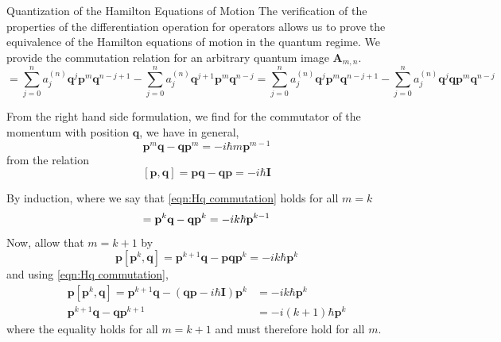 \documentclass[aspectratio=169]{beamer}
\begin{document}
	\begin{frame}[allowframebreaks]{Quantization of the Hamilton Equations of Motion}
		The verification of the properties of the differentiation operation for operators allows us to prove the equivalence of the Hamilton equations of motion in the quantum regime. We provide the commutation relation for an arbitrary quantum image $\textbf{A}_{m,n}$.
		\begin{equation}
			[\textbf{A}_{m,n},\textbf{q}]=\sum_{j=0}^na_j^{(n)}\textbf{q}^{j}\textbf{p}^m\textbf{q}^{n-j+1}-\sum_{j=0}^na_j^{(n)}\textbf{q}^{j+1}\textbf{p}^m\textbf{q}^{n-j}=\sum_{j=0}^na_j^{(n)}\textbf{q}^{j}\textbf{p}^m\textbf{q}^{n-j+1}-\sum_{j=0}^na_j^{(n)}\textbf{q}^{j}\textbf{q}\textbf{p}^m\textbf{q}^{n-j}
		\end{equation}
		
		From the right hand side formulation, we find for the commutator of the momentum with position $\textbf{q}$, we have in general, 
		\begin{equation}
			\textbf{p}^m\textbf{q}-\textbf{q}\textbf{p}^m=-i\hbar m\textbf{p}^{m-1}
		\end{equation}
		from the relation
		\begin{equation}\label{eqn:Hq commutation}
			[\textbf{p},\textbf{q}]=\textbf{p}\textbf{q}-\textbf{q}\textbf{p}=-i\hbar\textbf{I}
		\end{equation}
		
		By induction, where we say that \ref{eqn:Hq commutation} holds for all $m=k$
		\begin{equation}
			[\textbf{p}^k,\textbf{q}]=\textbf{p}^k\textbf{q}-\textbf{q}\textbf{p}^k=-ik\hbar\textbf{\textbf{p}}^{k-1}
		\end{equation}
		Now, allow that $m=k+1$ by
		\begin{equation}
			\textbf{p}[\textbf{p}^k,\textbf{q}]=\textbf{p}^{k+1}\textbf{q}-\textbf{p}\textbf{q}\textbf{p}^{k}=-ik\hbar\textbf{p}^{k}
		\end{equation}
		and using \ref{eqn:Hq commutation},
		\begin{align}
			\textbf{p}[\textbf{p}^k,\textbf{q}]=\textbf{p}^{k+1}\textbf{q}-(\textbf{q}\textbf{p}-i\hbar\textbf{I})\textbf{p}^{k}&=-ik\hbar\textbf{p}^{k} \\
			\textbf{p}^{k+1}\textbf{q}-\textbf{q}\textbf{p}^{k+1}&=-i(k+1)\hbar\textbf{p}^{k}
		\end{align}
		where the equality holds for all $m=k+1$ and must therefore hold for all $m$.
		

\end{frame}
\end{document}
